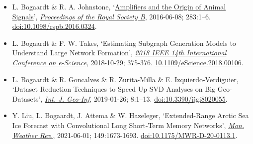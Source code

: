\documentclass[a4paper,8pt]{extarticle}
\begin{document}
\begin{itemize}[leftmargin=*]
\setlength{\itemsep}{-0.7mm}
\item L. Bogaardt \& R. A. Johnstone, `\href{http://www.lbogaardt.eu/?s=m2p}{Amplifiers and the Origin of Animal Signals}', \textit{\href{http://rspb.royalsocietypublishing.org/content/283/1832/20160324}{Proceedings of the Royal Society B}}, 2016-06-08; 283:1--6. \href{http://doi.org/10.1098/rspb.2016.0324}{doi:10.1098/rspb.2016.0324}.
\item L. Bogaardt \& F. W. Takes, `Estimating Subgraph Generation Models to Understand Large Network Formation', \textit{\href{https://ieeexplore.ieee.org/abstract/document/8588725}{2018 IEEE 14th International Conference on e-Science}}, 2018-10-29; 375-376. \href{http://doi.org/10.1109/eScience.2018.00106}{10.1109/eScience.2018.00106}.
\item L. Bogaardt \& R. Goncalves \& R. Zurita-Milla \& E. Izquierdo-Verdiguier, `Dataset Reduction Techniques to Speed Up SVD Analyses on Big Geo-Datasets', \textit{\href{https://www.mdpi.com/2220-9964/8/2/55}{Int. J. Geo-Inf}}, 2019-01-26; 8:1--13. \href{http://doi.org/10.3390/ijgi8020055}{doi:10.3390/ijgi8020055}.
\item Y. Liu, L. Bogaardt, J. Attema \& W. Hazeleger, `Extended-Range Arctic Sea Ice Forecast with Convolutional Long Short-Term Memory Networks', \textit{\href{https://journals.ametsoc.org/view/journals/mwre/149/6/MWR-D-20-0113.1.xml}{Mon. Weather Rev.}}, 2021-06-01; 149:1673-1693. \href{https://doi.org/10.1175/MWR-D-20-0113.1}{doi:10.1175/MWR-D-20-0113.1}.
\end{itemize}
\end{document}

